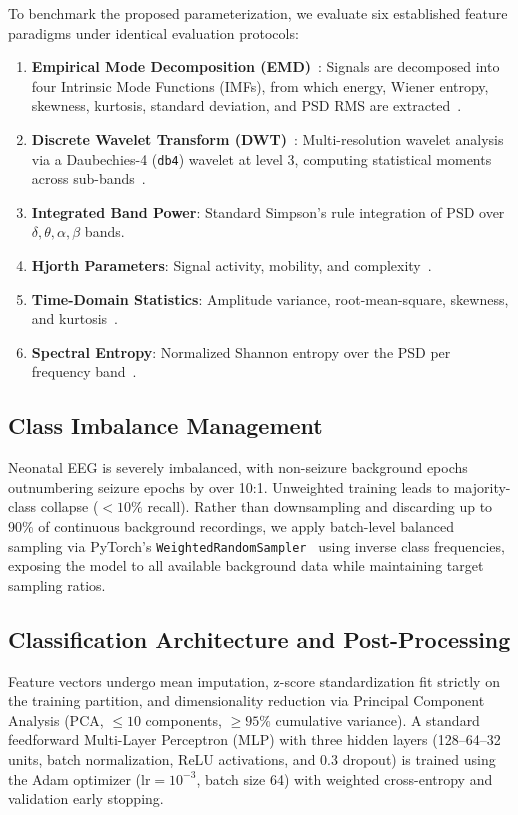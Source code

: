 \documentclass[10pt,twocolumn,letterpaper]{article}
\begin{document}
To benchmark the proposed parameterization, we evaluate six established feature paradigms under identical evaluation protocols:
\begin{enumerate}
    \item \textbf{Empirical Mode Decomposition (EMD)}~\cite{huang1998}: Signals are decomposed into four Intrinsic Mode Functions (IMFs), from which energy, Wiener entropy, skewness, kurtosis, standard deviation, and PSD RMS are extracted~\cite{pan2024}.
    \item \textbf{Discrete Wavelet Transform (DWT)}~\cite{daubechies1992}: Multi-resolution wavelet analysis via a Daubechies-4 (\texttt{db4}) wavelet at level 3, computing statistical moments across sub-bands~\cite{subasi2007}.
    \item \textbf{Integrated Band Power}: Standard Simpson's rule integration of PSD over $\delta, \theta, \alpha, \beta$ bands.
    \item \textbf{Hjorth Parameters}: Signal activity, mobility, and complexity~\cite{hjorth1970}.
    \item \textbf{Time-Domain Statistics}: Amplitude variance, root-mean-square, skewness, and kurtosis~\cite{greene2008}.
    \item \textbf{Spectral Entropy}: Normalized Shannon entropy over the PSD per frequency band~\cite{temko2011}.
\end{enumerate}

\subsection{Class Imbalance Management}\label{subsec:sampler}

Neonatal EEG is severely imbalanced, with non-seizure background epochs outnumbering seizure epochs by over 10:1. Unweighted training leads to majority-class collapse ($<10\%$ recall). Rather than downsampling and discarding up to 90\% of continuous background recordings, we apply batch-level balanced sampling via PyTorch's \texttt{WeightedRandomSampler}~\cite{paszke2019} using inverse class frequencies, exposing the model to all available background data while maintaining target sampling ratios.

\subsection{Classification Architecture and Post-Processing}\label{subsec:nn}

Feature vectors undergo mean imputation, z-score standardization fit strictly on the training partition, and dimensionality reduction via Principal Component Analysis (PCA, $\le 10$ components, $\ge 95\%$ cumulative variance). A standard feedforward Multi-Layer Perceptron (MLP) with three hidden layers (128--64--32 units, batch normalization, ReLU activations, and 0.3 dropout) is trained using the Adam optimizer ($\text{lr} = 10^{-3}$, batch size 64) with weighted cross-entropy and validation early stopping.
\end{document}
